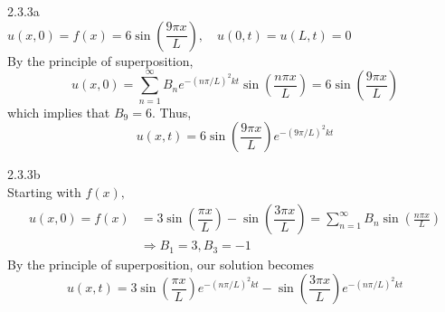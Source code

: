 \documentclass{article}
\theoremstyle{definition}
\begin{document}
    \begin{prob}{2.3.3a} $  $ \vspace{1mm} \\
    	$ u(x,0) = f(x) = 6\sin\left( \dfrac{9\pi x}{L} \right), \quad u(0,t) = u(L,t) = 0 $ \\
    	
    	By the principle of superposition,
    	\[
    		u(x,0) = \sum\limits_{n=1}^{\infty} B_n e^{-(n\pi/L)^2kt} \sin\left( \frac{n\pi x}{L} \right) = 6\sin\left( \frac{9\pi x}{L} \right)
    	\]
    	which implies that $ B_9 = 6 $. Thus,
    	\[
    		\boxed{ u(x,t) = 6\sin\left( \frac{9\pi x}{L} \right) e^{-(9\pi/L)^2kt}  }
    	\]
    \end{prob}
    
    	
    \begin{prob}{2.3.3b} $ $ \vspace{1mm} \\
    	Starting with $f(x),$
    	\begin{align*}
    		u(x,0) = f(x) &= 3\sin\left( \dfrac{\pi x}{L} \right) - \sin\left( \dfrac{3\pi x}{L} \right) = \sum\limits_{n=1}^{\infty} B_n \sin\left( \frac{n\pi x}{L} \right) \\
    		& \Rightarrow B_1 = 3, B_3 = -1
    	\end{align*}
    	By the principle of superposition, our solution becomes
    	\[
    		\boxed{u(x,t) = 3\sin\left( \frac{\pi x}{L} \right) e^{-(n\pi/L)^2 kt} - \sin\left( \frac{3\pi x}{L} \right) e^{-(n\pi/L)^2kt} }
    	\]
    \end{prob}
    
\end{document}
